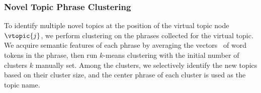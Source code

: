 \subsubsection{Novel Topic Phrase Clustering}
\label{subsubsec:clustering}
To identify multiple novel topics at the position of the virtual topic node $\vtopic{j}$, we perform clustering on the phrases collected for the virtual topic.
We acquire semantic features of each phrase by averaging the \glove vectors~\cite{pennington2014glove} of word tokens in the phrase, then run $k$-means clustering with the initial number of clusters $k$ manually set.
Among the clusters, we selectively identify the new topics based on their cluster size, and the center phrase of each cluster is used as the topic name.


